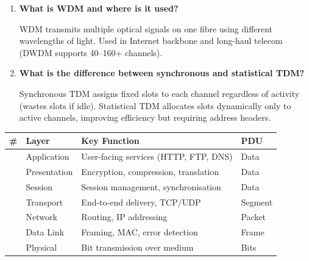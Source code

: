 \documentclass[12pt,a4paper]{article}
\newcommand{\Q}[1]{\textbf{#1}\par\noindent\ignorespaces}
\begin{document}
\begin{tcolorbox}[exambox, title={\textbf{Frequently Asked / Viva Questions}}]
\begin{enumerate}[leftmargin=*, topsep=0pt, label=\textbf{Q\arabic*.}, itemsep=8pt]
  \item \Q{What is WDM and where is it used?} WDM transmits multiple optical signals on one fibre using different wavelengths of light. Used in Internet backbone and long-haul telecom (DWDM supports 40--160+ channels).
  \item \Q{What is the difference between synchronous and statistical TDM?} Synchronous TDM assigns fixed slots to each channel regardless of activity (wastes slots if idle). Statistical TDM allocates slots dynamically only to active channels, improving efficiency but requiring address headers.
\end{enumerate}
\end{tcolorbox}

\vspace{6pt}

\begin{tcolorbox}[tikzbox, title={\textbf{OSI Layer Summary Table}}]
\begin{tabularx}{\linewidth}{|>{\centering\arraybackslash}p{0.5cm}|B{2.8cm}|X|>{\centering\arraybackslash}p{2.2cm}|}
\hline
\textbf{\#} & \textbf{Layer} & \textbf{Key Function} & \textbf{PDU} \\
 & Application  & User-facing services (HTTP, FTP, DNS) & Data \\
 & Presentation & Encryption, compression, translation & Data \\
 & Session      & Session management, synchronisation & Data \\
 & Transport    & End-to-end delivery, TCP/UDP & Segment \\
 & Network      & Routing, IP addressing & Packet \\
 & Data Link    & Framing, MAC, error detection & Frame \\
 & Physical     & Bit transmission over medium & Bits \\
\hline
\end{tabularx}
\end{tcolorbox}
\end{document}
